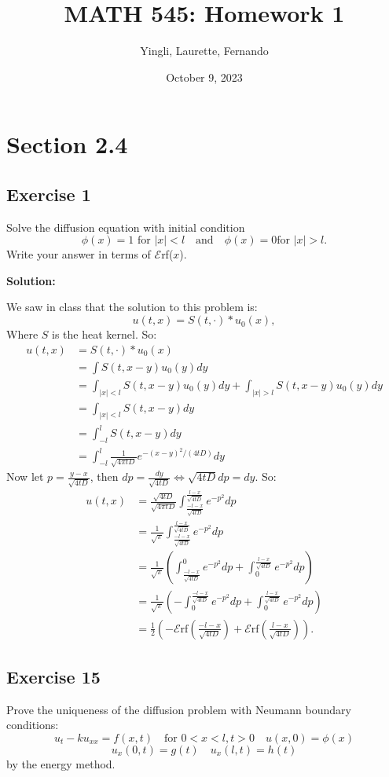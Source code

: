 \documentclass{article}
\title{MATH 545: Homework 1}
\author{Yingli, Laurette, Fernando}
\date{October 9, 2023}
\begin{document}
\maketitle
\section{Section 2.4}
\subsection{Exercise 1}
Solve the diffusion equation with initial condition
\[
\phi(x)=1\text{ for }|x|<l \quad \text{and} \quad \phi(x)=0 \text{
for } |x|>l.
\]
Write your answer in terms of $\mathscr{E}$rf($x$).

\textbf{Solution:}

We saw in class that the solution to this problem is:
\[
    u(t,x)=S(t,\cdot)\ast u_0(x),
\]
Where $S$ is the heat kernel. So:
\begin{align*}
    u(t,x)
    &=S(t,\cdot)\ast u_0(x)\\
    &=\int S(t,x-y)u_0(y)dy\\
    &=\int_{|x|<l} S(t,x-y)u_0(y)dy+ \int_{|x|> l} S(t,x-y)u_0(y)dy\\
    &=\int_{|x|<l} S(t,x-y)dy\\
    &=\int_{-l}^lS(t,x-y)dy\\
    &=\int_{-l}^l\frac{1}{\sqrt{4\pi t D}} e^{-(x-y)^2/(4tD)}dy
\end{align*}
Now let $p=\frac{y-x}{\sqrt{4tD}}$, then $dp=\frac{dy}{\sqrt{4tD}}\iff
\sqrt{4tD}dp=dy$. So:
\begin{align*}
    u(t,x)
    &=\frac{\sqrt{4tD}}{\sqrt{4\pi t
    D}}\int_{\frac{-l-x}{\sqrt{4tD}}}^{\frac{l-x}{\sqrt{4tD}}} e^{-p^2}dp\\
    &=\frac{1}{\sqrt{\pi}}\int_{\frac{-l-x}{\sqrt{4tD}}}^{\frac{l-x}{\sqrt{4tD}}} e^{-p^2}dp\\
    &=\frac{1}{\sqrt{\pi}}\left(\int_{\frac{-l-x}{\sqrt{4tD}}}^{0}
    e^{-p^2}dp+\int_{0}^{\frac{l-x}{\sqrt{4tD}}} e^{-p^2}dp\right)\\
    &=\frac{1}{\sqrt{\pi}}\left(-\int_{0}^{\frac{-l-x}{\sqrt{4tD}}}
    e^{-p^2}dp+\int_{0}^{\frac{l-x}{\sqrt{4tD}}} e^{-p^2}dp\right)\\
    &=\frac{1}{2}\left(-\mathscr{E}\text{rf}\left(\frac{-l-x}{\sqrt{4tD}}\right)+\mathscr{E}\text{rf}\left(\frac{l-x}{\sqrt{4tD}}\right)\right).
\end{align*}
\subsection{Exercise 15}
Prove the uniqueness of the diffusion problem with Neumann boundary conditions:
\[
    u_t-ku_{xx}=f(x,t) \quad \text{for } 0<x<l,t>0 \quad u(x,0)=\phi(x)
\]
\[
    u_x(0,t)=g(t)\quad u_x(l,t)=h(t)
\]
by the energy method.
\end{document}
